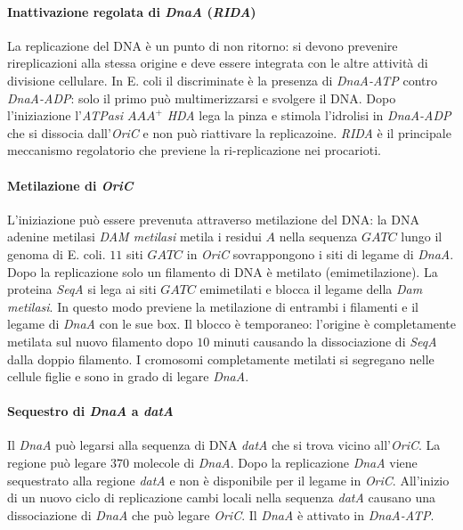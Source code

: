 \paragraph{Inattivazione regolata di \emph{DnaA} (\emph{RIDA})}
La replicazione del DNA \`e un punto di non ritorno: si devono prevenire rireplicazioni alla stessa origine e deve essere integrata con le altre attivit\`a di divisione cellulare. In
E. coli il discriminate \`e la presenza di \emph{DnaA-ATP} contro \emph{DnaA-ADP}: solo il primo pu\`o multimerizzarsi e svolgere il DNA. Dopo l'iniziazione l'\emph{ATPasi $AAA^+$} 
\emph{HDA} lega la pinza e stimola l'idrolisi in \emph{DnaA-ADP} che si dissocia dall'\emph{OriC} e non pu\`o riattivare la replicazoine. \emph{RIDA} \`e il principale meccanismo 
regolatorio che previene la ri-replicazione nei procarioti. 
\paragraph{Metilazione di \emph{OriC}}
L'iniziazione pu\`o essere prevenuta attraverso metilazione del DNA: la DNA adenine metilasi \emph{DAM metilasi} metila i residui $A$ nella sequenza $GATC$ lungo il genoma di E. coli. 
$11$ siti $GATC$ in \emph{OriC} sovrappongono i siti di legame di \emph{DnaA}. Dopo la replicazione solo un filamento di DNA \`e metilato (emimetilazione). La proteina \emph{SeqA} si 
lega ai siti $GATC$ emimetilati e blocca il legame della \emph{Dam  metilasi}. In questo modo previene la metilazione di entrambi i filamenti e il legame di \emph{DnaA} con le sue 
box. Il blocco \`e temporaneo: l'origine \`e completamente metilata sul nuovo filamento dopo $10$ minuti causando la dissociazione di \emph{SeqA} dalla doppio filamento. I cromosomi
completamente metilati si segregano nelle cellule figlie e sono in grado di legare \emph{DnaA}. 
\paragraph{Sequestro di \emph{DnaA} a \emph{datA}}
Il \emph{DnaA} pu\`o legarsi alla sequenza di DNA \emph{datA} che si trova vicino all'\emph{OriC}. La regione pu\`o legare $370$ molecole di \emph{DnaA}. Dopo la replicazione \emph{DnaA}
viene sequestrato alla regione \emph{datA} e non \`e disponibile per il legame in \emph{OriC}. All'inizio di un nuovo ciclo di replicazione cambi locali nella sequenza \emph{datA} 
causano una dissociazione di \emph{DnaA} che pu\`o legare \emph{OriC}. Il \emph{DnaA} \`e attivato in \emph{DnaA-ATP}. 
